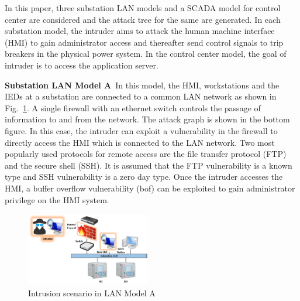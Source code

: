 In this paper, three substation LAN models and a SCADA model for control center are considered and the attack tree for the same are generated. In each substation model, the intruder aims to attack the human machine interface (HMI) to gain administrator access and thereafter send control signals to trip breakers in the physical power system. In the control center model, the goal of intruder is to access the application server.

\noindent\textbf{Substation LAN Model A}\ 
In this model, the HMI, workstations and the IEDs at a substation are connected to a common LAN network as shown in Fig.~\ref{fig:model-A}. A single firewall with an ethernet switch controls the passage of information to and from the network. The attack graph is shown in the bottom figure. In this case, the intruder can exploit a vulnerability in the firewall to directly access the HMI which is connected to the LAN network. Two most popularly used protocols for remote access are the file transfer protocol (FTP) and the secure shell (SSH). It is assumed that the FTP vulnerability is a known type and SSH vulnerability is a zero day type. Once the intruder accesses the HMI, a buffer overflow vulnerability (bof) can be exploited to gain administrator privilege on the HMI system.
\begin{figure}[htbp]
	\includegraphics[width=0.48\textwidth]{A-model.png}
	\caption{Intrusion scenario in LAN Model A}\label{fig:model-A}
\end{figure}

